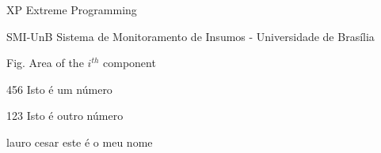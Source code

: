 \begin{siglas}
  \item[XP] Extreme Programming
  \item[SMI-UnB] Sistema de Monitoramento de Insumos - Universidade de Brasília
  \item[Fig.] Area of the $i^{th}$ component
  \item[456] Isto é um número
  \item[123] Isto é outro número
  \item[lauro cesar] este é o meu nome
\end{siglas}
